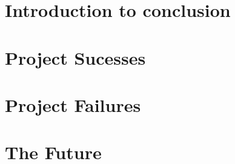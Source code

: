 \section {Introduction to conclusion}


\section{Project Sucesses}

\section{Project Failures}

\section{The Future}
